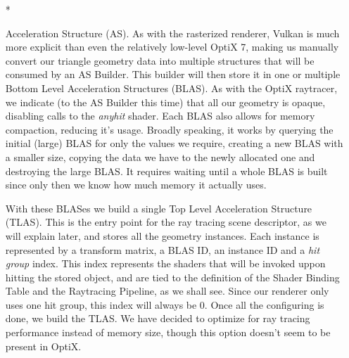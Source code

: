 \begin{itemize}
  \item[*]{Acceleration Structure (AS). As with the rasterized renderer, Vulkan is much more explicit than even the relatively low-level OptiX 7, making us manually convert our triangle geometry data into multiple structures that will be consumed by an AS Builder. This builder will then store it in one or multiple Bottom Level Acceleration Structures (BLAS). As with the OptiX raytracer, we indicate (to the AS Builder this time) that all our geometry is opaque, disabling calls to the \textit{anyhit} shader. Each BLAS also allows for memory compaction, reducing it's usage. Broadly speaking, it works by querying the initial (large) BLAS for only the values we require, creating a new BLAS with a smaller size, copying the data we have to the newly allocated one and destroying the large BLAS. It requires waiting until a whole BLAS is built since only then we know how much memory it actually uses.

    With these BLASes we build a single Top Level Acceleration Structure (TLAS). This is the entry point for the ray tracing scene descriptor, as we will explain later, and stores all the geometry instances. Each instance is represented by a transform matrix, a BLAS ID, an instance ID and a \textit{hit group} index. This index represents the shaders that will be invoked uppon hitting the stored object, and are tied to the definition of the Shader Binding Table and the Raytracing Pipeline, as we shall see. Since our renderer only uses one hit group, this index will always be 0. Once all the configuring is done, we build the TLAS. We have decided to optimize for ray tracing performance instead of memory size, though this option doesn't seem to be present in OptiX.}


\end{itemize}
